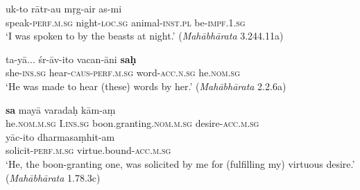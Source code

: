 \documentclass[output=paper,
modfonts
]{LSP/langsci}
\begin{document}
\begin{exe}
\ex\label{ex:efg}
\begin{xlist}
\ex\label{ex:ukto}\gll uk-to rātr-au mṛg-air as-mi \\
	speak-\textsc{perf.m.sg} night-\textsc{loc.sg} animal-\textsc{inst.pl} be-\textsc{impf.1.sg} \\
	\glt `I was spoken to by the beasts at night.' (\textit{Mahābhārata}  3.244.11a)
	
\ex\label{ex:taya}\gll ta-yā...  śr-āv-ito vacan-āni \textbf{saḥ} \\  
she-\textsc{ins.sg} hear-\textsc{caus-perf.m.sg} word-\textsc{acc.n.sg} he.\textsc{nom.sg} \\
\glt `He was made to hear (these) words by her.' (\textit{Mahābhārata}  2.2.6a)

\ex\label{ex:sa}\gll \textbf{sa} mayā varadaḥ  kām-aṃ \\
he.\textsc{nom.m.sg} I.\textsc{ins.sg} boon.granting.\textsc{nom.m.sg} desire-\textsc{acc.m.sg} \\

\gll yāc-ito dharmasaṃhit-am \\ 
solicit-\textsc{perf.m.sg} virtue.bound-\textsc{acc.m.sg} \\
\glt `He, the boon-granting one, was solicited by me for (fulfilling my) virtuous desire.' (\textit{Mahābhārata} 1.78.3c)
\end{xlist}
\end{exe}
\end{document}
